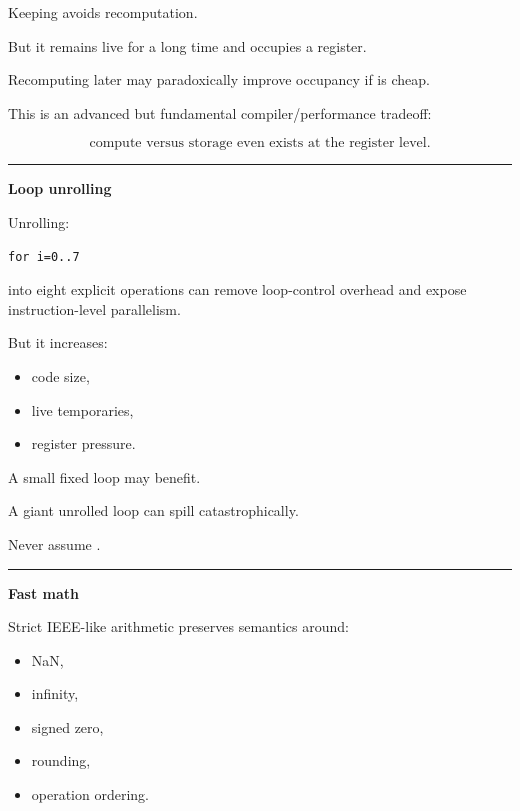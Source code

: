 Keeping  avoids recomputation.

But it remains live for a long time and occupies a register.

Recomputing  later may paradoxically improve occupancy if  is cheap.

This is an advanced but fundamental compiler/performance tradeoff:

\[
\boxed{
\text{compute versus storage even exists at the register level}.
}
\]

\begin{center}\rule{0.5\linewidth}{0.5pt}\end{center}

\textbf{Loop unrolling}

Unrolling:

\protect{}\label{p10-unroll}%
\begin{verbatim}
for i=0..7
\end{verbatim}

into eight explicit operations can remove loop-control overhead and expose instruction-level parallelism.

But it increases:

\begin{itemize}
\tightlist
\item
  code size,
\item
  live temporaries,
\item
  register pressure.
\end{itemize}

A small fixed loop may benefit.

A giant unrolled loop can spill catastrophically.

Never assume .

\begin{center}\rule{0.5\linewidth}{0.5pt}\end{center}

\textbf{Fast math}

Strict IEEE-like arithmetic preserves semantics around:

\begin{itemize}
\tightlist
\item
  NaN,
\item
  infinity,
\item
  signed zero,
\item
  rounding,
\item
  operation ordering.
\end{itemize}

